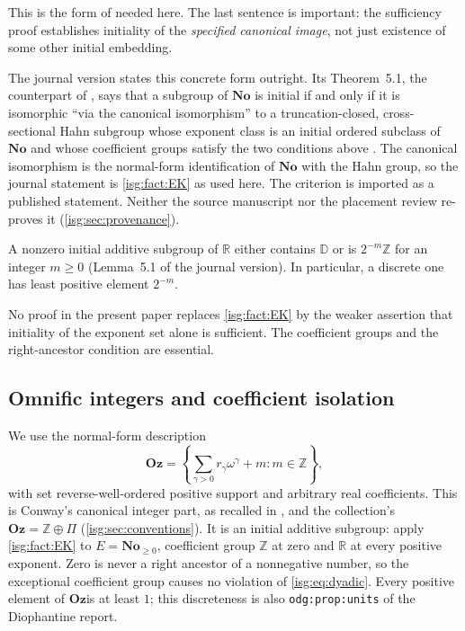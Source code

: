 \documentclass[11pt]{article}
\theoremstyle{definition}
\theoremstyle{remark}
\newcommand{\No}{\ensuremath{\mathbf{No}}}
\newcommand{\Oz}{\ensuremath{\mathbf{Oz}}}
\newcommand{\R}{\mathbb{R}}
\newcommand{\Z}{\mathbb{Z}}
\newcommand{\D}{\mathbb{D}}
\newcommand{\replabel}[1]{\nolinkurl{#1}}
\begin{document}
This is the form of \cite[Theorem~1 and its proof]{EK} needed here.
The last sentence is important: the sufficiency proof establishes
initiality of the \emph{specified canonical image}, not just existence of
some other initial embedding.

The journal version states this concrete form outright. Its Theorem~5.1,
the counterpart of \cite[Theorem~1]{EK}, says that a subgroup of $\No$ is
initial if and only if it is isomorphic ``via the canonical isomorphism''
to a truncation-closed, cross-sectional Hahn subgroup whose exponent
class is an initial ordered subclass of $\No$ and whose coefficient
groups satisfy the two conditions above \cite{EKjournal}. The canonical
isomorphism is the normal-form identification of $\No$ with the Hahn
group, so the journal statement is \cref{isg:fact:EK} as used here.
The criterion is imported as a published statement. Neither the source
manuscript nor the placement review re-proves it
(\cref{isg:sec:provenance}).

\begin{fact}\label{isg:fact:real}
A nonzero initial additive subgroup of $\R$ either contains $\D$ or is
$2^{-m}\Z$ for an integer $m\ge0$ \cite[Lemma~3]{EK}
\textup{(}Lemma~5.1 of the journal version\textup{)}.
In particular, a discrete one has least positive element $2^{-m}$.
\end{fact}

No proof in the present paper replaces \cref{isg:fact:EK} by the weaker
assertion that initiality of the exponent set alone is sufficient. The
coefficient groups and the right-ancestor condition are essential.

\subsection{Omnific integers and coefficient isolation}
We use the normal-form description
\begin{equation}\label{isg:eq:Oz}
 \Oz=\left\{\sum_{\gamma>0}r_\gamma\omega^\gamma+m:
           m\in\Z\right\},
\end{equation}
with set reverse-well-ordered positive support and arbitrary real
coefficients. This is Conway's canonical integer part, as recalled in
\cite[Section~6.2]{Kaplan}, and the collection's $\Oz=\Z\oplus\Pi$
(\cref{isg:sec:conventions}). It is an initial additive subgroup: apply
\cref{isg:fact:EK} to $E=\No_{\ge0}$, coefficient group $\Z$ at zero and
$\R$ at every positive exponent. Zero is never a right ancestor of a
nonnegative number, so the exceptional coefficient group causes no
violation of \eqref{isg:eq:dyadic}. Every positive element of \Oz is at
least $1$; this discreteness is also \replabel{odg:prop:units} of the
Diophantine report.
\end{document}
